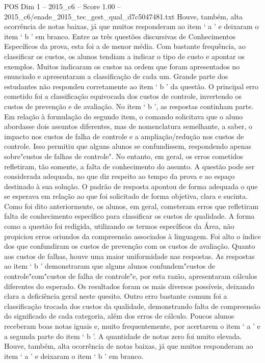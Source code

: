 \begin{textsample}{POS Dim 1 – 2015\_c6 – Score 1.00 – 2015\_c6/enade\_2015\_tec\_gest\_qual\_d7c5047481.txt}
Houve, também, alta ocorrência de notas baixas, já que muitos responderam ao item ‘ a ’ e deixaram o item ‘ b ’ em branco.
Entre as três questões discursivas de Conhecimentos Específicos da prova, esta foi a de menor média.
Com bastante frequência, ao classificar os custos, os alunos tendiam a indicar o tipo de custo e apontar os exemplos.
Muitos indicaram os custos na ordem que foram apresentados no enunciado e apresentaram a classificação de cada um.
Grande parte dos estudantes não respondeu corretamente ao item ‘ b ’ da questão.
O principal erro cometido foi a classificação equivocada dos custos de controle, invertendo os custos de prevenção e de avaliação.
No item ‘ b ’, as respostas continham parte.
Em relação à formulação do segundo item, o comando solicitava que o aluno abordasse dois assuntos diferentes, mas de nomenclatura semelhante, a saber, o impacto nos custos de falha de controle e a ampliação/redução nos custos de controle.
Isso permitiu que alguns alunos se confundissem, respondendo apenas sobre"custos de falhas de controle".
No entanto, em geral, os erros cometidos refletiram, tão somente, a falta de conhecimento do assunto.
A questão pode ser considerada adequada, no que diz respeito ao tempo da prova e ao espaço destinado à sua solução.
O padrão de resposta apontou de forma adequada o que se esperava em relação ao que foi solicitado de forma objetiva, clara e sucinta.
Como foi dito anteriormente, os alunos, em geral, cometeram erros que refletiram falta de conhecimento específico para classificar os custos de qualidade.
A forma como a questão foi redigida, utilizando os termos específicos da Área, não propiciou erros oriundos da compreensão associados à linguagem.
Foi alto o índice dos que confundiram os custos de prevenção com os custos de avaliação.
Quanto aos custos de falhas, houve uma maior uniformidade nas respostas.
As respostas ao item ‘ b ’ demonstraram que alguns alunos confundem"custos de controle"com"custos de falha de controle"e, por esta razão, apresentaram cálculos diferentes do esperado.
Os resultados foram os mais diversos possíveis, deixando clara a deficiência geral neste quesito.
Outro erro bastante comum foi a classificação trocada dos custos da qualidade, demonstrando falta de compreensão do significado de cada categoria, além dos erros de cálculo.
Poucos alunos receberam boas notas iguais e, muito frequentemente, por acertarem o item ‘ a ’ e a segunda parte do item ‘ b ’.
A quantidade de notas zero foi muito elevada.
Houve, também, alta ocorrência de notas baixas, já que muitos responderam ao item ‘ a ’ e deixaram o item ‘ b ’ em branco.

\end{textsample}
